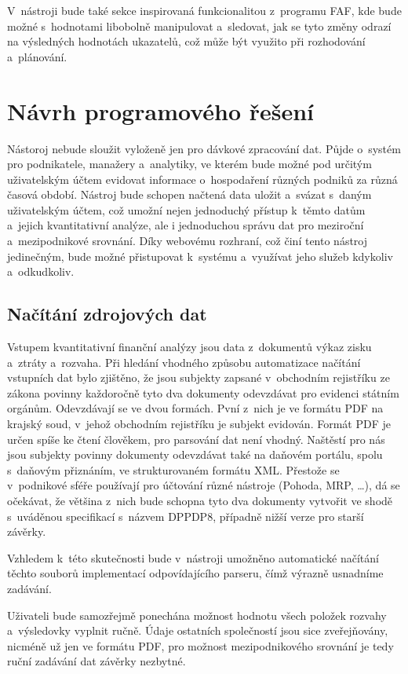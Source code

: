 V~nástroji bude také sekce  inspirovaná funkcionalitou z~programu FAF, kde bude možné s~hodnotami libobolně manipulovat a~sledovat, jak se tyto změny odrazí na výsledných hodnotách ukazatelů, což může být využito při rozhodování a~plánování.

\section{Návrh programového řešení}

Nástoroj nebude sloužit vyloženě jen pro dávkové zpracování dat. Půjde o~systém pro podnikatele, manažery a~analytiky, ve kterém bude možné pod určitým uživatelským účtem evidovat informace o~hospodaření různých podniků za různá časová období. Nástroj bude schopen načtená data uložit a~svázat s~daným uživatelským účtem, což umožní nejen jednoduchý přístup k~těmto datům a~jejich kvantitativní analýze, ale i jednoduchou správu dat pro meziroční a~mezipodnikové srovnání. Díky webovému rozhraní, což činí tento nástroj jedinečným, bude možné přistupovat k~systému a~využívat jeho služeb kdykoliv a~odkudkoliv.

\subsection{Načítání zdrojových dat}
Vstupem kvantitativní finanční analýzy jsou data z~dokumentů výkaz zisku a~ztráty a~rozvaha. Při hledání vhodného způsobu automatizace načítání vstupních dat bylo zjištěno, že jsou subjekty zapsané v~obchodním rejistříku ze zákona povinny každoročně tyto dva dokumenty odevzdávat pro evidenci státním orgánům. 
Odevzdávají se ve dvou formách. Pvní z~nich je ve formátu PDF na krajský soud, v~jehož obchodním rejistříku je subjekt evidován. Formát PDF je určen spíše ke čtení člověkem, pro parsování dat není vhodný. Naštěstí pro nás jsou subjekty povinny dokumenty odevzdávat také na daňovém portálu, spolu s~daňovým přiznáním, ve strukturovaném formátu XML. Přestože se v~podnikové sféře používají pro účtování různé nástroje (Pohoda, MRP, \dots), dá se očekávat, že většina z~nich bude schopna tyto dva dokumenty vytvořit ve shodě s~uváděnou specifikací s~názvem DPPDP8, případně nižší verze pro starší závěrky.

Vzhledem k~této skutečnosti bude v~nástroji umožněno automatické načítání těchto souborů implementací odpovídajícího parseru, čímž výrazně usnadníme zadávání.

Uživateli bude samozřejmě ponechána možnost hodnotu všech položek rozvahy a~výsledovky vyplnit ručně. Údaje ostatních společností jsou sice zveřejňovány, nicméně už jen ve formátu PDF, pro možnost mezipodnikového srovnání je tedy ruční zadávání dat závěrky nezbytné.







